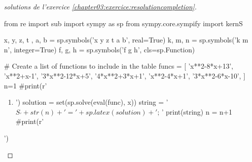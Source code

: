 \documentclass[main.tex]{subfiles}
\begin{document}
\begin{proof}[solutions  de l'exercice \ref{chapter03:exercice:resolutioncompletion}]
	\scriptsize
\begin{pycode}
from re import sub
import sympy as sp
from sympy.core.sympify import kernS

x, y, z, t , a, b = sp.symbols('x y z t a b', real=True)
k, m, n = sp.symbols('k m n', integer=True)
f, g, h = sp.symbols('f g h', cls=sp.Function)

# Create a list of functions to include in the table
funcs = [
'x**2-8*x+13',
'x**2+x-1',
'3*x**2-12*x+5',
'4*x**2+3*x+1',
'x**2-4*x+1', 
'3*x**2-6*x-10',
]
n=1
#print(r' \begin{enumerate}[label={$S_{\arabic*}=$},leftmargin=*] ')
for func in funcs:
	#	print('\item ')
	solution = set(sp.solve(eval(func), x))
	string =  '$S_'+ str(n)+ '=' +  sp.latex(solution ) + '$; '
	print(string)
	n = n+1
#print(r'\end{enumerate}')
\end{pycode}
\scriptsize 
\end{proof}  
\end{document}
